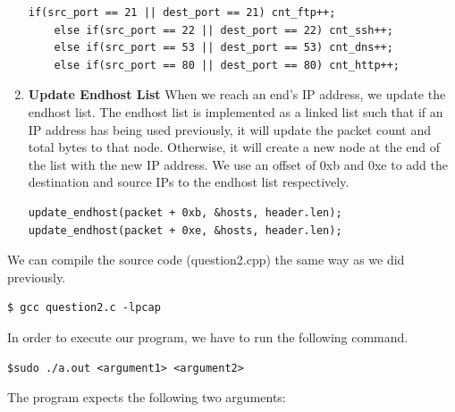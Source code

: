 \documentclass[a4paper,11pt]{article}
\begin{document}
\begin{enumerate}
\begin{mdframed}[backgroundcolor=light-gray, roundcorner=30pt,leftmargin=1, rightmargin=1, innerleftmargin=5, innertopmargin=-3,innerbottommargin=5, outerlinewidth=1, linecolor=light-gray]
\begin{lstlisting}
if(src_port == 21 || dest_port == 21) cnt_ftp++;
	else if(src_port == 22 || dest_port == 22) cnt_ssh++;
	else if(src_port == 53 || dest_port == 53) cnt_dns++;
	else if(src_port == 80 || dest_port == 80) cnt_http++;
\end{lstlisting}
\end{mdframed}
\item \textbf{Update Endhost List} 
\newline When we reach an end's IP address, we update the endhost list. The endhost list is implemented as a linked list such that if an IP address has being used previously, it will update the packet count and total bytes to that node. Otherwise, it will create a new node at the end of the list with the new IP address. We use an offset of 0xb and 0xe to add the destination and source IPs to the endhost list respectively.
\begin{mdframed}[backgroundcolor=light-gray, roundcorner=30pt,leftmargin=1, rightmargin=1, innerleftmargin=5, innertopmargin=-3,innerbottommargin=5, outerlinewidth=1, linecolor=light-gray]
\begin{lstlisting}
update_endhost(packet + 0xb, &hosts, header.len);
update_endhost(packet + 0xe, &hosts, header.len);
\end{lstlisting}
\end{mdframed}
\end{enumerate}
We can compile the source code (question2.cpp) the same way as we did previously.
\begin{mdframed}[backgroundcolor=light-gray, roundcorner=30pt,leftmargin=1, rightmargin=1, innerleftmargin=5, innertopmargin=-3,innerbottommargin=5, outerlinewidth=1, linecolor=light-gray]
\begin{lstlisting}
$ gcc question2.c -lpcap
\end{lstlisting}
\end{mdframed}
In order to execute our program, we have to run the following command.
\begin{mdframed}[backgroundcolor=light-gray, roundcorner=30pt,leftmargin=1, rightmargin=1, innerleftmargin=5, innertopmargin=-3,innerbottommargin=5, outerlinewidth=1, linecolor=light-gray]
\begin{lstlisting}
$sudo ./a.out <argument1> <argument2>
\end{lstlisting}
\end{mdframed}
The program expects the following two arguments:
\end{document}
